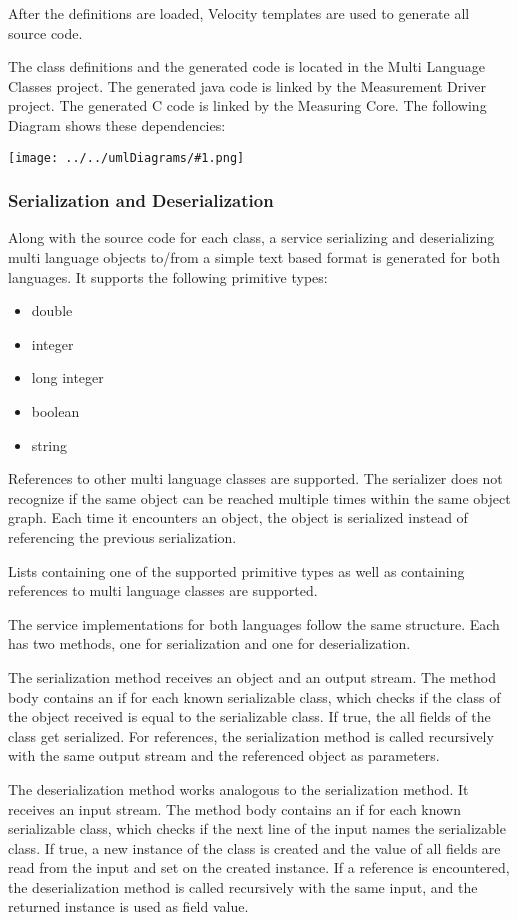 \documentclass[a4paper,12pt]{article}
\newcommand{\umlDiagram}[1]{\begin{center}\texttt{[image: ../../umlDiagrams/\#1.png]}\end{center}}
\begin{document}
After the definitions are loaded, Velocity templates are used to generate all source code.

The class definitions and the generated code is located in the Multi Language Classes project. The generated java code is linked by the Measurement Driver project. The generated C code is linked by the Measuring Core. The following Diagram shows these dependencies:

\umlDiagram{CodeGenerationDependencies}

\subsubsection{Serialization and Deserialization}
Along with the source code for each class, a service serializing and deserializing multi language objects to/from a simple text based format is generated for both languages. It supports the following primitive types:
\begin{itemize}
\item double
\item integer
\item long integer
\item boolean
\item string
\end{itemize}

References to other multi language classes are supported. The serializer does not recognize if the same object can be reached multiple times within the same object graph. Each time it encounters an object, the object is serialized instead of referencing the previous serialization.

Lists containing one of the supported primitive types as well as containing references to multi language classes are supported.

The service implementations for both languages follow the same structure. Each has two methods, one for serialization and one for deserialization. 

The serialization method receives an object and an output stream. The  method body contains an if for each known serializable class, which checks if the class of the object received is equal to the serializable class. If true, the all fields of the class get serialized. For references, the  serialization method is called recursively with the same output stream and the  referenced object as parameters.

The deserialization method works analogous to the serialization method. It receives an input stream. The method body contains an if for each known serializable class, which checks if the next line of the input names  the serializable class. If true, a new instance of the class is created and the value of all fields are read from the input and set on the created instance. If a reference is encountered, the deserialization method is called recursively with the same input, and the returned instance is used as field value.
\end{document}
